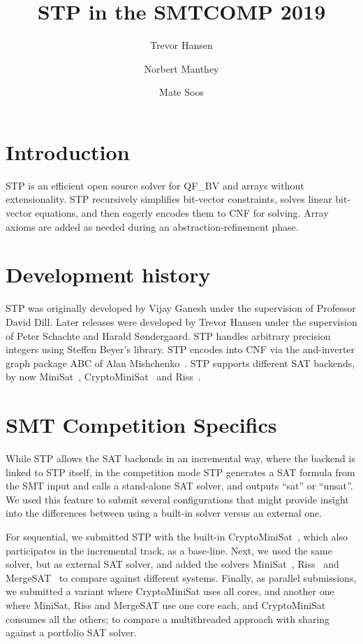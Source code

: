 \documentclass{llncs}
\begin{document}
\title{STP in the SMTCOMP 2019}
\author{Trevor Hansen \and Norbert Manthey \and Mate Soos}

\maketitle
\thispagestyle{empty}
\pagestyle{empty}

\section{Introduction}
STP\cite{Vijay:Thesis:2007} is an efficient open source solver for QF\_BV and arrays without extensionality. STP recursively simplifies bit-vector constraints, solves linear bit-vector equations, and then eagerly encodes them to CNF for solving. Array axioms are added as needed during an abstraction-refinement phase.

\section{Development history}
STP was originally developed by Vijay Ganesh under the supervision of Professor David Dill. Later releases were developed by Trevor Hansen under the supervision of Peter Schachte and Harald Søndergaard. STP handles arbitrary precision integers using Steffen Beyer's library. STP encodes into CNF via the and-inverter graph package ABC of Alan Mishchenko~\cite{Brayton:2010:AAI:2144310.2144317}.
STP supports different SAT backends, by now MiniSat~\cite{MiniSat:github}, CryptoMiniSat~\cite{CMS:github} and Riss~\cite{Riss:github}.

\section{SMT Competition Specifics}

While STP allows the SAT backends in an incremental way, where the backend is linked to STP itself, in the competition mode STP generates a SAT formula from the SMT input and calls a stand-alone SAT solver, and outputs ``sat'' or ``unsat''.
We used this feature to submit several configurations that might provide insight into the differences between using a built-in solver versus an external one.

For sequential, we submitted STP with the built-in CryptoMiniSat~\cite{CMS:github}, which also participates in the incremental track, as a base-line.
Next, we used the same solver, but as external SAT solver, and added the solvers MiniSat~\cite{MiniSat:github}, Riss~\cite{Riss:github} and MergeSAT~\cite{MergeSAT:github} to compare against different systems.
Finally, as parallel submissions, we submitted a variant where CryptoMiniSat uses all cores, and another one where MiniSat, Riss and MergeSAT use one core each, and CryptoMiniSat consumes all the others; to compare a multithreaded approach with sharing against a portfolio SAT solver.
\end{document}
